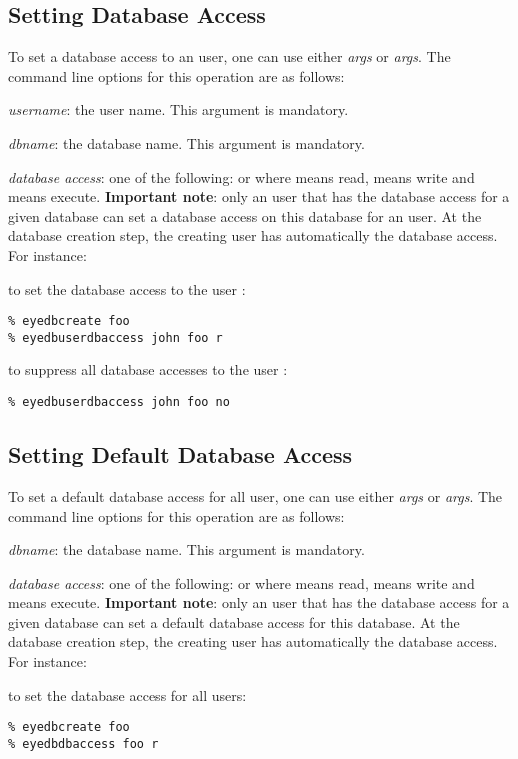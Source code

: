 \subsection{Setting Database Access}
To set a database access to an \eyedb user,
one can use either 
\emph{args}
or  \emph{args}.
The command line options for this operation are as follows:
\bi
\item \emph{username}: the user name. This argument is mandatory.
\item \emph{dbname}: the database name. This argument is mandatory.
\item \emph{database access}: one of the following:
 or  where  means read,
 means write and  means execute.
\ei
{\bf Important note}: only an \eyedb user that has the  database
access for a given database
can set a database access on this database for an \eyedb user.
At the database creation step, the creating \eyedb user has automatically
the  database access.
For instance:
\bi
\item to set the  database access to the user :
\verbsize
\begin{verbatim}
% eyedbcreate foo
% eyedbuserdbaccess john foo r
\end{verbatim}
\normalsize
\item to suppress all database accesses to the user :
\verbsize
\begin{verbatim}
% eyedbuserdbaccess john foo no
\end{verbatim}
\normalsize
\ei
\subsection{Setting Default Database Access}
To set a default database access for all \eyedb user,
one can use either 
\emph{args}
or  \emph{args}.
The command line options for this operation are as follows:
\bi
\item \emph{dbname}: the database name. This argument is mandatory.
\item \emph{database access}: one of the following:
 or  where  means read,
 means write and  means execute.
\ei
{\bf Important note}: only an \eyedb user that has the  database
access for a given database
can set a default database access for this database.
At the database creation step, the creating \eyedb user has automatically
the  database access.
For instance:
\bi
\item to set the  database access for all users:
\verbsize
\begin{verbatim}
% eyedbcreate foo
% eyedbdbaccess foo r
\end{verbatim}
\normalsize
\ei

